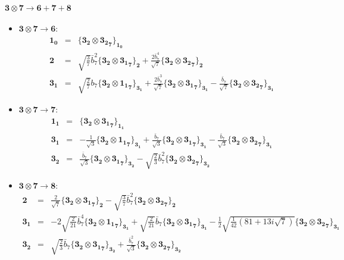 \documentclass[english]{article}
\newcommand{\subcg}[3]{\big\{ {#1}\otimes{#2}\big\}^{}_{#3}}
\newcommand{\rep}[1]{\mathbf{#1}}
\begin{document}
\paragraph*{\Large $\rep{3}\otimes\rep{7}\to\rep{6}+\rep{7}+\rep{8}$}
\begin{itemize}
\item $\rep{3}\otimes\rep{7}\to\rep{6}$:
\begin{eqnarray*}
\rep{1_0} &=& \subcg{\rep{3_2}}{\rep{3_2}_{\rep{7}}}{\rep{1_0}}
\\
\rep{2} &=& \sqrt{\frac{3}{7}} \bar{b}_7^2\subcg{\rep{3_2}}{\rep{3_1}_{\rep{7}}}{\rep{2}}+\frac{2 \bar{b}_7^4}{\sqrt{7}}\subcg{\rep{3_2}}{\rep{3_2}_{\rep{7}}}{\rep{2}}
\\
\rep{3_1} &=& \sqrt{\frac{2}{7}} b_7\subcg{\rep{3_2}}{\rep{1_1}_{\rep{7}}}{\rep{3_1}}+\frac{2 \bar{b}_7^3}{\sqrt{7}}\subcg{\rep{3_2}}{\rep{3_1}_{\rep{7}}}{\rep{3_1}}-\frac{\bar{b}_7}{\sqrt{7}}\subcg{\rep{3_2}}{\rep{3_2}_{\rep{7}}}{\rep{3_1}}
\end{eqnarray*}
\item $\rep{3}\otimes\rep{7}\to\rep{7}$:
\begin{eqnarray*}
\rep{1_1} &=& \subcg{\rep{3_2}}{\rep{3_1}_{\rep{7}}}{\rep{1_1}}
\\
\rep{3_1} &=& -\frac{1}{\sqrt{3}}\subcg{\rep{3_2}}{\rep{1_1}_{\rep{7}}}{\rep{3_1}}+\frac{\bar{b}_7}{\sqrt{3}}\subcg{\rep{3_2}}{\rep{3_1}_{\rep{7}}}{\rep{3_1}}-\frac{\bar{b}_7}{\sqrt{3}}\subcg{\rep{3_2}}{\rep{3_2}_{\rep{7}}}{\rep{3_1}}
\\
\rep{3_2} &=& \frac{\bar{b}_7}{\sqrt{3}}\subcg{\rep{3_2}}{\rep{3_1}_{\rep{7}}}{\rep{3_2}}-\sqrt{\frac{2}{3}} \bar{b}_7^2\subcg{\rep{3_2}}{\rep{3_2}_{\rep{7}}}{\rep{3_2}}
\end{eqnarray*}
\item $\rep{3}\otimes\rep{7}\to\rep{8}$:
\begin{eqnarray*}
\rep{2} &=& \frac{2}{\sqrt{7}}\subcg{\rep{3_2}}{\rep{3_1}_{\rep{7}}}{\rep{2}}-\sqrt{\frac{3}{7}} \bar{b}_7^2\subcg{\rep{3_2}}{\rep{3_2}_{\rep{7}}}{\rep{2}}
\\
\rep{3_1} &=& -2 \sqrt{\frac{2}{21}} \bar{b}_7^4\subcg{\rep{3_2}}{\rep{1_1}_{\rep{7}}}{\rep{3_1}}+\sqrt{\frac{2}{21}} \bar{b}_7\subcg{\rep{3_2}}{\rep{3_1}_{\rep{7}}}{\rep{3_1}}-\frac{1}{2} \sqrt{\frac{1}{42} \left(81+13 i \sqrt{7}\right)}\subcg{\rep{3_2}}{\rep{3_2}_{\rep{7}}}{\rep{3_1}}
\\
\rep{3_2} &=& \sqrt{\frac{2}{3}} \bar{b}_7\subcg{\rep{3_2}}{\rep{3_1}_{\rep{7}}}{\rep{3_2}}+\frac{\bar{b}_7^2}{\sqrt{3}}\subcg{\rep{3_2}}{\rep{3_2}_{\rep{7}}}{\rep{3_2}}
\end{eqnarray*}
\end{itemize}
\end{document}

